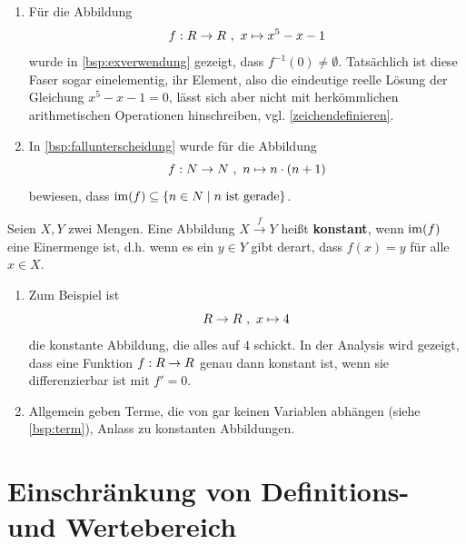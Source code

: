 \begin{bsp}[*] \quad
    \begin{enumerate}
        \item Für die Abbildung
            \[ f : \R \to \R \ ,\ x\mapsto x^5-x-1 \]
        wurde in \cref{bsp:exverwendung} gezeigt, dass $f^{-1}(0)\neq\emptyset$. Tatsächlich ist diese Faser sogar einelementig, ihr Element, also die eindeutige reelle Lösung der Gleichung $x^5-x-1=0$, lässt sich aber nicht mit herkömmlichen arithmetischen Operationen hinschreiben, vgl. \cref{zeichendefinieren}.
        \item In \cref{bsp:fallunterscheidung} wurde für die Abbildung
            \[ f : \N \to \N \ ,\ n \mapsto n\cdot (n+1) \]
        bewiesen, dass $\operatorname{im}(f)\subseteq \{n\in \relax N\mid n\ \text{ist gerade}\}$.
    \end{enumerate}
\end{bsp}


\begin{defin} 
    Seien $X,Y$ zwei Mengen. Eine Abbildung $X\xrightarrow{f} Y$ heißt \textbf{konstant}, wenn $\operatorname{im}(f)$ eine Einermenge ist, d.h. wenn es ein $y\in Y$ gibt derart, dass $f(x)=y$ für alle $x\in X$.
\end{defin}


\begin{bsp} \quad
    \begin{enumerate}
        \item Zum Beispiel ist
            \[ \R \to \R \ ,\ x\mapsto 4 \]
        die konstante Abbildung, die alles auf $4$ schickt. In der Analysis wird gezeigt, dass eine Funktion $f : \relax R\to \relax R$ genau dann konstant ist, wenn sie differenzierbar ist mit $f'=0$.
        \item Allgemein geben Terme, die von gar keinen Variablen abhängen (siehe \cref{bsp:term}), Anlass zu konstanten Abbildungen.
    \end{enumerate}
\end{bsp}





\section{Einschränkung von Definitions- und Wertebereich}


